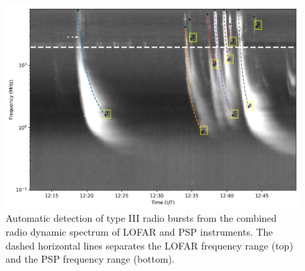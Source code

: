 \begin{figure}
   \centering
   \includegraphics[width=0.8\hsize]{chapter3/figs/auto_detect_typeIIIs.png}
      \caption{Automatic detection of type III radio bursts from the combined radio dynamic spectrum of LOFAR and PSP instruments. The dashed horizontal lines separates the LOFAR frequency range (top) and the PSP frequency range (bottom).}
    \label{lofar_psp_burst_detect}
\end{figure}

